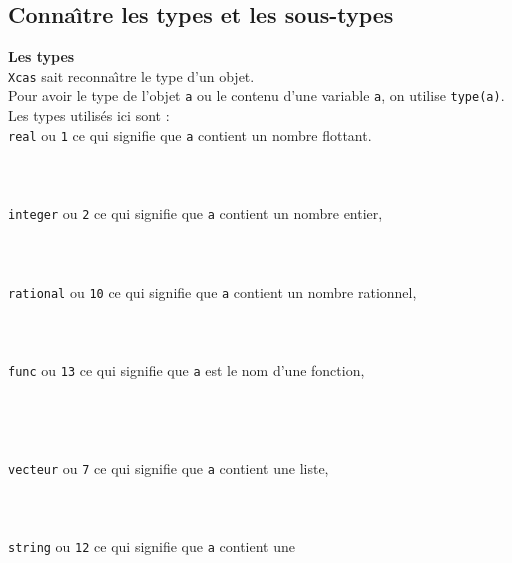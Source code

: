 \documentclass[12pt,a4paper]{book}
\begin{document}
\begin{giacjshere}
\subsection{Conna\^{\i}tre les types et les sous-types}
{\bf Les types}\\
{\tt Xcas} sait reconna\^{\i}tre le type d’un objet.\\
Pour avoir le type de l'objet {\tt a} ou le contenu d'une variable {\tt a}, on 
utilise {\tt type(a)}.\\
Les types utilis\'es ici sont :\\
{\tt real} ou {\tt 1} ce qui signifie que {\tt a} contient un nombre flottant.\\
\\
\\
\\
{\tt integer} ou {\tt 2} ce qui signifie que {\tt a} contient un nombre 
entier,\\
\\
\\
\\
{\tt rational} ou {\tt 10} ce qui signifie que {\tt a} contient un nombre 
rationnel,\\
\\
\\
\\
{\tt func} ou {\tt 13} ce qui signifie que {\tt a} est le nom d'une 
fonction,\\
\\
\\
\\
\\
{\tt vecteur} ou {\tt 7} ce qui signifie que {\tt a} contient une liste,\\ 
\\
\\
\\
{\tt string} ou {\tt 12} ce qui signifie que {\tt a} contient une 

\end{giacjshere}
\end{document}
